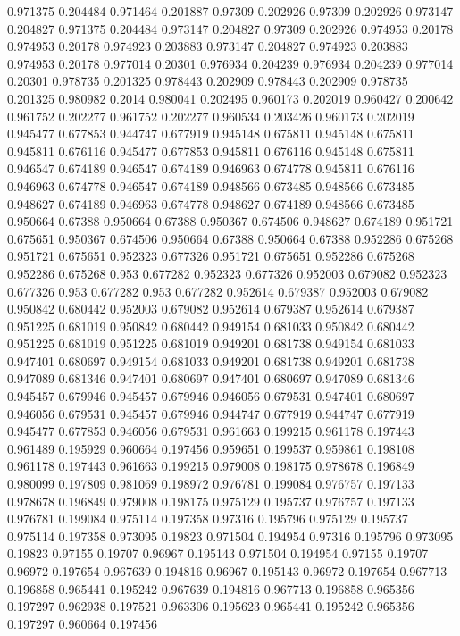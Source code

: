 0.971375 0.204484
0.971464 0.201887
0.97309 0.202926
0.97309 0.202926
0.973147 0.204827
0.971375 0.204484
0.973147 0.204827
0.97309 0.202926
0.974953 0.20178
0.974953 0.20178
0.974923 0.203883
0.973147 0.204827
0.974923 0.203883
0.974953 0.20178
0.977014 0.20301
0.976934 0.204239
0.976934 0.204239
0.977014 0.20301
0.978735 0.201325
0.978443 0.202909
0.978443 0.202909
0.978735 0.201325
0.980982 0.2014
0.980041 0.202495
0.960173 0.202019
0.960427 0.200642
0.961752 0.202277
0.961752 0.202277
0.960534 0.203426
0.960173 0.202019
0.945477 0.677853
0.944747 0.677919
0.945148 0.675811
0.945148 0.675811
0.945811 0.676116
0.945477 0.677853
0.945811 0.676116
0.945148 0.675811
0.946547 0.674189
0.946547 0.674189
0.946963 0.674778
0.945811 0.676116
0.946963 0.674778
0.946547 0.674189
0.948566 0.673485
0.948566 0.673485
0.948627 0.674189
0.946963 0.674778
0.948627 0.674189
0.948566 0.673485
0.950664 0.67388
0.950664 0.67388
0.950367 0.674506
0.948627 0.674189
0.951721 0.675651
0.950367 0.674506
0.950664 0.67388
0.950664 0.67388
0.952286 0.675268
0.951721 0.675651
0.952323 0.677326
0.951721 0.675651
0.952286 0.675268
0.952286 0.675268
0.953 0.677282
0.952323 0.677326
0.952003 0.679082
0.952323 0.677326
0.953 0.677282
0.953 0.677282
0.952614 0.679387
0.952003 0.679082
0.950842 0.680442
0.952003 0.679082
0.952614 0.679387
0.952614 0.679387
0.951225 0.681019
0.950842 0.680442
0.949154 0.681033
0.950842 0.680442
0.951225 0.681019
0.951225 0.681019
0.949201 0.681738
0.949154 0.681033
0.947401 0.680697
0.949154 0.681033
0.949201 0.681738
0.949201 0.681738
0.947089 0.681346
0.947401 0.680697
0.947401 0.680697
0.947089 0.681346
0.945457 0.679946
0.945457 0.679946
0.946056 0.679531
0.947401 0.680697
0.946056 0.679531
0.945457 0.679946
0.944747 0.677919
0.944747 0.677919
0.945477 0.677853
0.946056 0.679531
0.961663 0.199215
0.961178 0.197443
0.961489 0.195929
0.960664 0.197456
0.959651 0.199537
0.959861 0.198108
0.961178 0.197443
0.961663 0.199215
0.979008 0.198175
0.978678 0.196849
0.980099 0.197809
0.981069 0.198972
0.976781 0.199084
0.976757 0.197133
0.978678 0.196849
0.979008 0.198175
0.975129 0.195737
0.976757 0.197133
0.976781 0.199084
0.975114 0.197358
0.97316 0.195796
0.975129 0.195737
0.975114 0.197358
0.973095 0.19823
0.971504 0.194954
0.97316 0.195796
0.973095 0.19823
0.97155 0.19707
0.96967 0.195143
0.971504 0.194954
0.97155 0.19707
0.96972 0.197654
0.967639 0.194816
0.96967 0.195143
0.96972 0.197654
0.967713 0.196858
0.965441 0.195242
0.967639 0.194816
0.967713 0.196858
0.965356 0.197297
0.962938 0.197521
0.963306 0.195623
0.965441 0.195242
0.965356 0.197297
0.960664 0.197456
